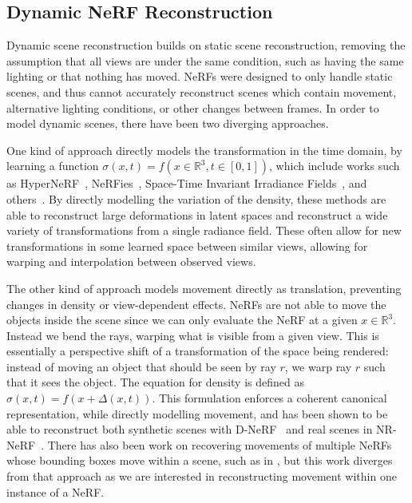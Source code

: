 \subsection*{Dynamic NeRF Reconstruction}

Dynamic scene reconstruction builds on static scene reconstruction, removing the assumption that all views are under the same condition, such as having the same lighting or that nothing has moved. NeRFs were designed to only handle static scenes, and thus cannot accurately reconstruct scenes which contain movement, alternative lighting conditions, or other changes between frames.
In order to model dynamic scenes, there have been two diverging approaches.

One kind of approach directly models the transformation in the time domain, by learning a function $\sigma(x,t)=f(x\in\mathbb{R}^3, t\in[0,1])$, which include works such as HyperNeRF~\cite{park2021hypernerf}, NeRFies~\cite{park2021nerfies}, Space-Time Invariant Irradiance Fields~\cite{xian2021space}, and others~\cite{Wang_2021_CVPR,du2021nerflow}. By directly modelling the variation of the density, these methods are able to reconstruct large deformations in latent spaces and reconstruct a wide variety of transformations from a single radiance field. These often allow for new transformations in some learned space between similar views, allowing for warping and interpolation between observed views.

The other kind of approach models movement directly as translation, preventing changes in density or view-dependent effects. NeRFs are not able to move the objects inside the scene since we can only evaluate the NeRF at a given $x\in\mathbb{R}^3$. Instead we bend the rays, warping what is visible from a given view. This is essentially a perspective shift of a transformation of the space being rendered: instead of moving an object that should be seen by ray $r$, we warp ray $r$ such that it sees the object. The equation for density is defined as $\sigma(x,t)=f(x+\Delta(x,t))$. This formulation enforces a coherent canonical representation, while directly modelling movement, and has been shown to be able to reconstruct both synthetic scenes with D-NeRF~\cite{pumarola2020dnerf} and real scenes in NR-NeRF~\cite{tretschk2021nonrigid}. There has also been work on recovering movements of multiple NeRFs whose bounding boxes move within a scene, such as in \cite{dynamicSceneGraphs}, but this work diverges from that approach as we are interested in reconstructing movement within one instance of a NeRF.

